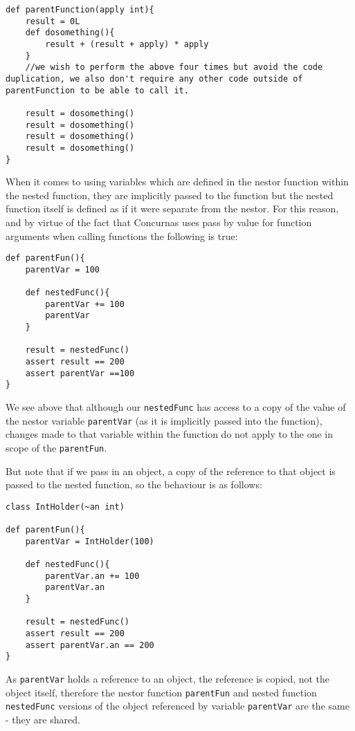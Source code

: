\documentclass[conc-doc]{subfiles}
\begin{document}
\begin{lstlisting}
def parentFunction(apply int){
	result = 0L
	def dosomething(){
		result + (result + apply) * apply
	}
	//we wish to perform the above four times but avoid the code duplication, we also don't require any other code outside of parentFunction to be able to call it.
	
	result = dosomething()
	result = dosomething()
	result = dosomething()
	result = dosomething()
}
\end{lstlisting}

When it comes to using variables which are defined in the nestor function within the nested function, they are implicitly passed to the function but the nested function itself is defined as if it were separate from the nestor. For this reason, and by virtue of the fact that Concurnas uses pass by value for function arguments when calling functions the following is true:

\begin{lstlisting}
def parentFun(){
	parentVar = 100
	
	def nestedFunc(){
		parentVar += 100
		parentVar
	}
	
	result = nestedFunc()
	assert result == 200
	assert parentVar ==100
}
\end{lstlisting}

We see above that although our \lstinline{nestedFunc} has access to a copy of the value of the nestor variable \lstinline{parentVar} (as it is implicitly passed into the function), changes made to that variable within the function do not apply to the one in scope of the \lstinline{parentFun}.

But note that if we pass in an object, a copy of the reference to that object is passed to the nested function, so the behaviour is as follows:

\begin{lstlisting}
class IntHolder(~an int)

def parentFun(){
	parentVar = IntHolder(100)
	
	def nestedFunc(){
		parentVar.an += 100
		parentVar.an
	}
	
	result = nestedFunc()
	assert result == 200
	assert parentVar.an == 200
}
\end{lstlisting}

As \lstinline{parentVar} holds a reference to an object, the reference is copied, not the object itself, therefore the nestor function \lstinline{parentFun} and nested function \lstinline{nestedFunc} versions of the object referenced by variable \lstinline{parentVar} are the same - they are shared.
\end{document}
